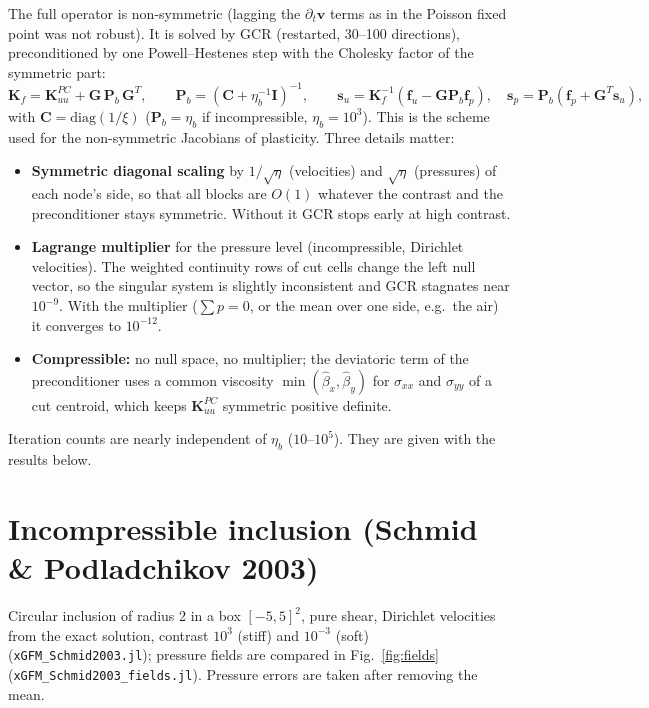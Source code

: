 \documentclass[11pt,a4paper]{article}
\newcommand{\code}[1]{\texttt{#1}}
\begin{document}
The full operator is non-symmetric (lagging the $\partial_t\mathbf v$ terms as in the Poisson
fixed point was not robust). It is solved by GCR (restarted, 30--100 directions), preconditioned
by one Powell--Hestenes step with the Cholesky factor of the symmetric part:
\[
\mathbf K_f=\mathbf K_{uu}^{PC}+\mathbf G\,\mathbf P_b\,\mathbf G^{T},\qquad
\mathbf P_b=(\mathbf C+\eta_b^{-1}\mathbf I)^{-1},\qquad
\mathbf s_u=\mathbf K_f^{-1}(\mathbf f_u-\mathbf G\mathbf P_b\mathbf f_p),\quad
\mathbf s_p=\mathbf P_b(\mathbf f_p+\mathbf G^T\mathbf s_u),
\]
with $\mathbf C=\mathrm{diag}(1/\xi)$ ($\mathbf P_b=\eta_b$ if incompressible, $\eta_b=10^3$).
This is the scheme used for the non-symmetric Jacobians of plasticity. Three details matter:
\begin{itemize}
  \item \textbf{Symmetric diagonal scaling} by $1/\sqrt{\eta}$ (velocities) and $\sqrt\eta$
    (pressures) of each node's side, so that all blocks are $O(1)$ whatever the contrast and the
    preconditioner stays symmetric. Without it GCR stops early at high contrast.
  \item \textbf{Lagrange multiplier} for the pressure level (incompressible, Dirichlet
    velocities). The weighted continuity rows of cut cells change the left null vector, so the
    singular system is slightly inconsistent and GCR stagnates near $10^{-9}$. With the
    multiplier ($\sum p=0$, or the mean over one side, e.g.\ the air) it converges to
    $10^{-12}$.
  \item \textbf{Compressible:} no null space, no multiplier; the deviatoric term of the
    preconditioner uses a common viscosity $\min(\hat\beta_x,\hat\beta_y)$ for $\sigma_{xx}$
    and $\sigma_{yy}$ of a cut centroid, which keeps $\mathbf K_{uu}^{PC}$ symmetric positive
    definite.
\end{itemize}
Iteration counts are nearly independent of $\eta_b$ ($10$--$10^5$). They are given with the
results below.

\section{Incompressible inclusion (Schmid \& Podladchikov 2003)}\label{sec:schmid}

Circular inclusion of radius 2 in a box $[-5,5]^2$, pure shear, Dirichlet velocities from the
exact solution, contrast $10^{3}$ (stiff) and $10^{-3}$ (soft) (\code{xGFM\_Schmid2003.jl}); pressure fields are compared in Fig.~\ref{fig:fields} (\code{xGFM\_Schmid2003\_fields.jl}).
Pressure errors are taken after removing the mean.
\end{document}
